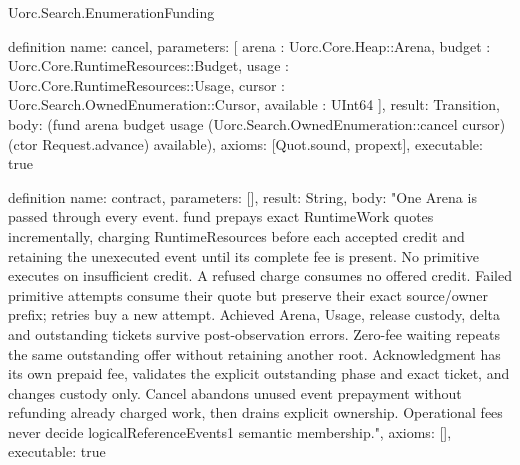\begin{lexlean}{Uorc.Search.EnumerationFunding}
\begin{semanticmodule}
definition{
  name: cancel,
  parameters: [
    arena : Uorc.Core.Heap::Arena,
    budget : Uorc.Core.RuntimeResources::Budget,
    usage : Uorc.Core.RuntimeResources::Usage,
    cursor : Uorc.Search.OwnedEnumeration::Cursor,
    available : UInt64
  ],
  result: Transition,
  body: (fund arena budget usage (Uorc.Search.OwnedEnumeration::cancel cursor) (ctor Request.advance) available),
  axioms: [Quot.sound, propext],
  executable: true
}

definition{
  name: contract,
  parameters: [],
  result: String,
  body: "One Arena is passed through every event. fund prepays exact RuntimeWork quotes incrementally, charging RuntimeResources before each accepted credit and retaining the unexecuted event until its complete fee is present. No primitive executes on insufficient credit. A refused charge consumes no offered credit. Failed primitive attempts consume their quote but preserve their exact source/owner prefix; retries buy a new attempt. Achieved Arena, Usage, release custody, delta and outstanding tickets survive post-observation errors. Zero-fee waiting repeats the same outstanding offer without retaining another root. Acknowledgment has its own prepaid fee, validates the explicit outstanding phase and exact ticket, and changes custody only. Cancel abandons unused event prepayment without refunding already charged work, then drains explicit ownership. Operational fees never decide logicalReferenceEvents1 semantic membership.",
  axioms: [],
  executable: true
}
\end{semanticmodule}
\end{lexlean}
